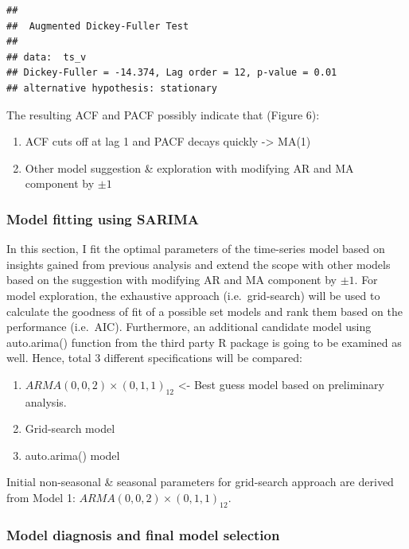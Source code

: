 \documentclass[
  11pt,
]{article}
\providecommand{\tightlist}{%
  \setlength{\itemsep}{0pt}\setlength{\parskip}{0pt}}
\begin{document}
\begin{verbatim}
## 
##  Augmented Dickey-Fuller Test
## 
## data:  ts_v
## Dickey-Fuller = -14.374, Lag order = 12, p-value = 0.01
## alternative hypothesis: stationary
\end{verbatim}

The resulting ACF and PACF possibly indicate that (Figure 6):

\begin{enumerate}
\def\labelenumi{\arabic{enumi}.}
\tightlist
\item
  ACF cuts off at lag 1 and PACF decays quickly -\textgreater{} MA(1)
\item
  Other model suggestion \& exploration with modifying AR and MA
  component by \(\pm1\)
\end{enumerate}

\newpage

\hypertarget{model-fitting-using-sarima}{%
\subsubsection{Model fitting using
SARIMA}\label{model-fitting-using-sarima}}

In this section, I fit the optimal parameters of the time-series model
based on insights gained from previous analysis and extend the scope
with other models based on the suggestion with modifying AR and MA
component by \(\pm1\). For model exploration, the exhaustive approach
(i.e.~grid-search) will be used to calculate the goodness of fit of a
possible set models and rank them based on the performance (i.e.~AIC).
Furthermore, an additional candidate model using auto.arima() function
from the third party R package is going to be examined as well. Hence,
total 3 different specifications will be compared:

\begin{enumerate}
\def\labelenumi{\arabic{enumi}.}
\tightlist
\item
  \(ARMA(0,0,2)\times(0,1,1)_{12}\) \textless- Best guess model based on
  preliminary analysis.
\item
  Grid-search model
\item
  auto.arima() model
\end{enumerate}

Initial non-seasonal \& seasonal parameters for grid-search approach are
derived from Model 1: \(ARMA(0,0,2)\times(0,1,1)_{12}\).

\newpage

\hypertarget{model-diagnosis-and-final-model-selection}{%
\subsubsection{Model diagnosis and final model
selection}\label{model-diagnosis-and-final-model-selection}}
\end{document}
